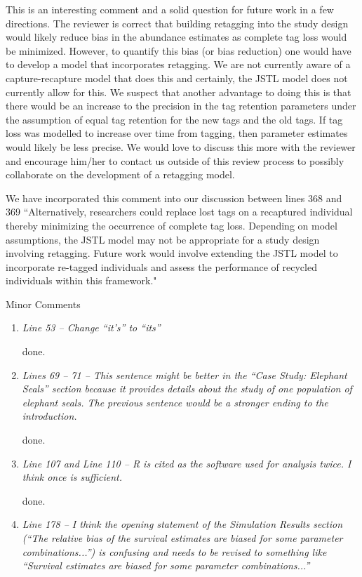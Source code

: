 \documentclass[12pt]{article}
\begin{document}
\begin{enumerate}
This is an interesting comment and a solid question for future work in a few directions.  The reviewer is correct that building retagging into the study design would likely reduce bias in the abundance estimates as complete tag loss would be minimized.  However, to quantify this bias (or bias reduction) one would have to develop a model that incorporates retagging. We are not currently aware of a capture-recapture model that does this and certainly, the JSTL model does not currently allow for this.  We suspect that another advantage to doing this is that there would be an increase to the precision in the tag retention parameters under the assumption of equal tag retention for the new tags and the old tags.  If tag loss was modelled to increase over time from tagging, then parameter estimates would likely be less precise. We would love to discuss this more with the reviewer and encourage him/her to contact us outside of this review process to possibly collaborate on the development of a retagging model.

We have incorporated this comment into our discussion between lines 368 and 369
``Alternatively, researchers could replace lost tags on a recaptured individual thereby minimizing the occurrence of complete tag loss.  Depending on model assumptions, the JSTL model may not be appropriate for a study design involving retagging.  Future work would involve extending the JSTL model to  incorporate re-tagged individuals and assess the performance of recycled individuals within this framework."

\noindent Minor Comments
\begin{enumerate}
\item {\it Line 53 – Change “it’s” to “its”} 

done.

\item {\it Lines 69 – 71 – This sentence might be better in the “Case Study: Elephant Seals” section because it provides details about the study of one population of elephant seals. The previous sentence would be a stronger ending to the introduction.} 

done.

\item {\it Line 107 and Line 110 – R is cited as the software used for analysis twice. I think once is sufficient.} 

done.

\item {\it Line 178 – I think the opening statement of the Simulation Results section (“The relative bias of the survival estimates are biased for some parameter combinations...”) is confusing and needs to be revised to something like “Survival estimates are biased for some parameter combinations...”} 


\end{enumerate}
\end{enumerate}
\end{document}
